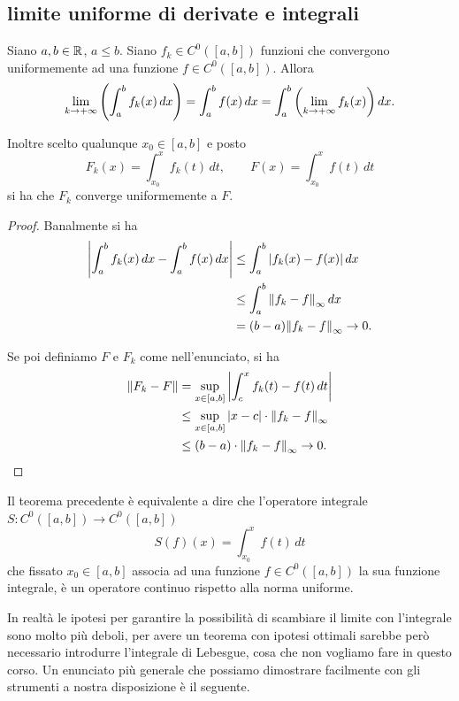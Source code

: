 \subsection{limite uniforme di derivate e integrali}

\begin{theorem}
\mymark{***}
Siano $a,b\in \mathbb R$, $a\le b$.
Siano $f_k\in C^0([a,b])$ funzioni che convergono uniformemente
ad una funzione $f\in C^0([a,b])$.
Allora
\[
  \lim_{k\to+\infty}{\left( \int_a^b f_k(x)\, dx \right)}
  = \int_a^b f(x)\, dx
  = \int_a^b {\left( \lim_{k\to +\infty} f_k(x) \right)} \, dx.
\]

Inoltre scelto qualunque $x_0\in [a,b]$ e posto
\[
  F_k(x) = \int_{x_0}^x f_k(t)\, dt,
  \qquad
  F(x) = \int_{x_0}^x f(t)\, dt
\]
si ha che $F_k$ converge uniformemente a $F$.
\end{theorem}
%
\begin{proof}
\mymark{***}
Banalmente si ha
\begin{align*}
  {\left|\int_a^b f_k(x)\, dx - \int_a^b f(x)\, dx\right|}
  &\le \int_a^b {\left|f_k(x) - f(x)\right|}\, dx \\
  &\le \int_a^b {\left\Vert f_k - f\right\Vert}_\infty\, dx \\
  &= (b-a) {\left\Vert f_k -f\right\Vert}_\infty
  \to 0.
\end{align*}

Se poi definiamo $F$ e $F_k$ come nell'enunciato, si ha
\begin{align*}
  {\left\Vert F_k-F\right\Vert}
  &= \sup_{x\in [a,b]} {\left|\int_c^x f_k(t)-f(t)\, dt\right|} \\
  &\le \sup_{x\in [a,b]} {\left|x-c\right|} \cdot {\left\Vert f_k-f\right\Vert}_\infty \\
  &\le (b-a) \cdot {\left\Vert f_k-f\right\Vert}_\infty
  \to 0.
\end{align*}
\end{proof}

Il teorema precedente è equivalente a dire che l'operatore integrale $S\colon C^0([a,b]) \to C^0([a,b])$
\[
S(f)(x) = \int_{x_0}^x f(t)\, dt
\]
che fissato $x_0 \in [a,b]$ associa ad una funzione $f\in C^0([a,b])$ la sua funzione integrale, è un operatore continuo rispetto alla norma uniforme.

In realtà le ipotesi per garantire la possibilità di scambiare
il limite con l'integrale sono molto più deboli, per avere un teorema
con ipotesi ottimali sarebbe però necessario introdurre l'integrale di Lebesgue,
cosa che non vogliamo fare in questo corso. Un enunciato più generale
che possiamo dimostrare facilmente con gli strumenti
a nostra disposizione è il seguente.

